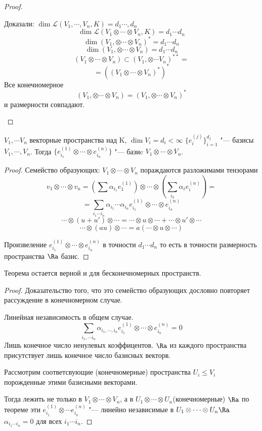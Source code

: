 \begin{proof}
\begin{enumerate}
    Доказали: $\dim \mathcal{L}(V_1, \cdots, V_n, K) = d_1 \cdots, d_n$
    $$\dim \mathcal{L}(V_1 \otimes \cdots \otimes V_n, K) = d_1 \cdots d_n$$
    $$\dim (V_1, \otimes \cdots \otimes V_n)^* = d_1 \cdots d_n$$
    $$\dim (V_1, \otimes \cdots \otimes V_n) = d_1 \cdots d_n$$
    $$(V_1 \otimes \cdots \otimes V_n) \subset (V_1, \otimes \cdots V_n)^{**} = $$
    $$= ((V_1 \otimes \cdots \otimes V_n)^*)^*$$
    Все конечномерное 
    $$(V_1, \otimes \cdots \otimes V_n) = (V_1, \otimes \cdots \otimes V_n)^*$$
    и размерности совпадают. 
    \end{enumerate}
\end{proof}

\begin{theorem}
$V_1, \cdots V_n$ векторные пространства над K, $\dim V_i = d_i < \infty$
$\{e_{i}^{(j)}\}_{i = 1}^{d_j}$ "--- базисы $V_1, \cdots, V_n$.
Тогда $\{e_{i_1}^{(1)} \otimes \cdots \otimes e_{i_n}^{(n)}\}$ "--- базиc $V_1 \otimes \cdots \otimes V_n$.
\end{theorem}
\begin{proof}
    Семейство образующих:
    $V_1 \otimes \cdots \otimes V_n$ пораждаются разложимами тензорами 
    $$v_1 \otimes \cdots \otimes v_n = (\sum \alpha_{i_1} e_1^{(1)}) \otimes \cdots \otimes (\sum_{i_k}\alpha_ie_i^{(n)}) =$$
    $$= \sum_{i_1 \cdots i_n}\alpha_{i_1} \cdots \alpha_{i_n} e_{i_1}^{(1)} \otimes\cdots \otimes e_{i_n}^{(n)}$$
    $$\cdots \otimes (u + u') \otimes \cdots = \cdots \otimes u \otimes \cdots + \cdots \otimes u' \otimes \cdots$$
    $$\cdots \otimes (au) \otimes \cdots = a(\cdots \otimes u \otimes \cdots) $$

    Произвеление $e_{i_1}^{(1)} \otimes \cdots \otimes e_{i_n}^{(n)}$ в точности $d_1 \cdots d_n$ то есть 
    в точности размерность пространства $\Ra$ базис. 
\end{proof}
\begin{Rem}
Теорема остается верной и для бесконечномерных пространств. 
\end{Rem}
\begin{proof}
    Доказательство того, что это семейство образующих дословно повторяет рассуждение в конечномерном случае. 

    Линейная независимость в общем случае. 
    $$\sum_{i_1,  \cdots i_n}\alpha_{i_1,\cdots, i_n}e_{i_1}^{(1)} \otimes \cdots \otimes e_{i_n}^{(n)} = 0$$
    Лишь конечное число ненулевых коэффицентов. 
    $\Ra$ из каждого пространства присутствует лишь конечное число базисных векторв. 

    Рассмотрим соответсвующие (конечномерные) пространства $U_i \le V_i$ порожденные этими базисными векторами. 

    Тогда лежить не только в $V_1 \otimes \cdots \otimes V_n$, а в $U_1 \otimes \cdots \otimes U_n$(конечномерные)
    $\Ra$ по теореме эти $e_{i_1}^{(1)} \otimes \cdots e_{i_n}^{(n)}$ "--- линейно независимые в $U_1 \otimes \cdots \otimes U_n \Ra$
    $\alpha_{i_1 \cdots i_n} = 0$ для всех $i_1 \cdots i_n$. 
\end{proof}
